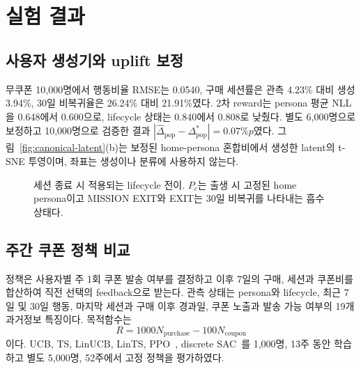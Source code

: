 \documentclass[9pt,twocolumn]{extarticle}
\begin{document}
\section{실험 결과}
\subsection{사용자 생성기와 uplift 보정}
무쿠폰 10,000명에서 행동비율 RMSE는 0.0540, 구매 세션률은 관측 4.23\% 대비
생성 3.94\%, 30일 비복귀율은 26.24\% 대비 21.91\%였다. 2차 reward는 persona
평균 NLL을 0.648에서 0.600으로, lifecycle 상태는 0.840에서 0.808로 낮췄다.
별도 6,000명으로 보정하고 10,000명으로 검증한 결과
$|\widehat\Delta_{\mathrm{pop}}-\Delta_{\mathrm{pop}}^*|=0.07\%p$였다.
그림~\ref{fig:canonical-latent}(b)는 보정된 home-persona 혼합비에서 생성한 latent의
t-SNE 투영이며, 좌표는 생성이나 분류에 사용하지 않는다.

\begin{figure}[b]
\centering
\resizebox{0.52\columnwidth}{!}{}
\caption{세션 종료 시 적용되는 lifecycle 전이. $P_c$는 출생 시 고정된 home
persona이고 MISSION EXIT와 EXIT는 30일 비복귀를 나타내는 흡수상태다.}
\label{fig:lifecycle}
\end{figure}

\subsection{주간 쿠폰 정책 비교}
정책은 사용자별 주 1회 쿠폰 발송 여부를 결정하고 이후 7일의 구매, 세션과 쿠폰비를
합산하여 직전 선택의 feedback으로 받는다. 관측 상태는 persona와 lifecycle,
최근 7일 및 30일 행동, 마지막 세션과 구매 이후 경과일, 쿠폰 노출과 발송 가능 여부의
19개 과거정보 특징이다. 목적함수는
\begin{equation}
R=1000N_{\mathrm{purchase}}-100N_{\mathrm{coupon}}
\end{equation}
이다. UCB, TS, LinUCB, LinTS, PPO~\cite{schulman2017}, discrete SAC~\cite{haarnoja2018}를
1,000명, 13주 동안 학습하고 별도 5,000명, 52주에서 고정 정책을 평가하였다.
\end{document}
